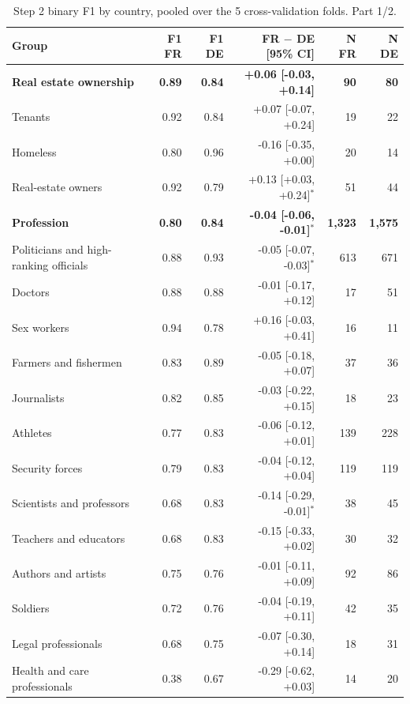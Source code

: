 \begin{table}[htbp]
\centering
\scriptsize
\begin{threeparttable}
\caption{Step 2 binary F1 by country, pooled over the 5 cross-validation folds. Part 1/2.}
\label{tab:step2-country-part1}
\begin{tabular}{l rr r rr}
\toprule
Group & F1 FR & F1 DE & FR $-$ DE [95\% CI] & N FR & N DE \\
\midrule
\textbf{Real estate ownership} & \textbf{0.89} & \textbf{0.84} & \textbf{+0.06 [-0.03, +0.14]} & \textbf{90} & \textbf{80} \\
\quad Tenants & 0.92 & 0.84 & +0.07 [-0.07, +0.24] & 19 & 22 \\
\quad Homeless & 0.80 & 0.96 & -0.16 [-0.35, +0.00] & 20 & 14 \\
\quad Real-estate owners & 0.92 & 0.79 & +0.13 [+0.03, +0.24]$^{*}$ & 51 & 44 \\
\addlinespace
\textbf{Profession} & \textbf{0.80} & \textbf{0.84} & \textbf{-0.04 [-0.06, -0.01]$^{*}$} & \textbf{1,323} & \textbf{1,575} \\
\quad Politicians and high-ranking officials & 0.88 & 0.93 & -0.05 [-0.07, -0.03]$^{*}$ & 613 & 671 \\
\quad Doctors & 0.88 & 0.88 & -0.01 [-0.17, +0.12] & 17 & 51 \\
\quad Sex workers & 0.94 & 0.78 & +0.16 [-0.03, +0.41] & 16 & 11 \\
\quad Farmers and fishermen & 0.83 & 0.89 & -0.05 [-0.18, +0.07] & 37 & 36 \\
\quad Journalists & 0.82 & 0.85 & -0.03 [-0.22, +0.15] & 18 & 23 \\
\quad Athletes & 0.77 & 0.83 & -0.06 [-0.12, +0.01] & 139 & 228 \\
\quad Security forces & 0.79 & 0.83 & -0.04 [-0.12, +0.04] & 119 & 119 \\
\quad Scientists and professors & 0.68 & 0.83 & -0.14 [-0.29, -0.01]$^{*}$ & 38 & 45 \\
\quad Teachers and educators & 0.68 & 0.83 & -0.15 [-0.33, +0.02] & 30 & 32 \\
\quad Authors and artists & 0.75 & 0.76 & -0.01 [-0.11, +0.09] & 92 & 86 \\
\quad Soldiers & 0.72 & 0.76 & -0.04 [-0.19, +0.11] & 42 & 35 \\
\quad Legal professionals & 0.68 & 0.75 & -0.07 [-0.30, +0.14] & 18 & 31 \\
\quad Health and care professionals & 0.38 & 0.67 & -0.29 [-0.62, +0.03] & 14 & 20 \\

\end{tabular}
\end{threeparttable}
\end{table}
